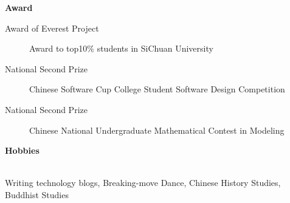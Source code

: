 \documentclass[letterpaper,11pt]{article}
\newcommand{\resheading}[1]{{\large \colorbox{mygrey}{\begin{minipage}{\textwidth}{\textbf{#1 \vphantom{p\^{E}}}}\end{minipage}}}}
\begin{document}
\resheading{Award}

\begin{description}
\item[Award of Everest Project ]
 Award to top10\% students in SiChuan University
\item[National Second Prize ]
 Chinese Software Cup College Student Software Design Competition 
\item[National Second Prize ]
 Chinese National Undergraduate Mathematical Contest in Modeling
\end{description}

\resheading{Hobbies}

\\[9pt]
Writing technology blogs, \quad Breaking-move Dance, \quad Chinese History Studies, \quad Buddhist Studies
\\[12pt]
\end{document}
